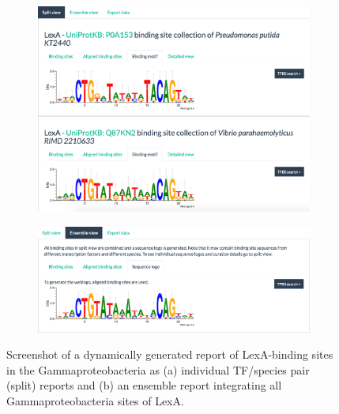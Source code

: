 \begin{figure}
  \centering
  \begin{subfigure}{0.9\textwidth}
  \includegraphics[width=1\textwidth]{figures/chapter2/report-split-view}
  \caption{}
  \end{subfigure}

  \begin{subfigure}{0.9\textwidth}
  \includegraphics[width=1\textwidth]{figures/chapter2/report-ensemble-view}
  \caption{}
  \end{subfigure}

  \caption[Screenshot of a dynamically generated report of LexA-binding sites
  in the Gammaproteobacteria.]{Screenshot of a dynamically generated report of
    LexA-binding sites in the Gammaproteobacteria as (a) individual TF/species
    pair (split) reports and (b) an ensemble report integrating all
    Gammaproteobacteria sites of LexA.}
\label{fig:motif-reports}
\end{figure}

